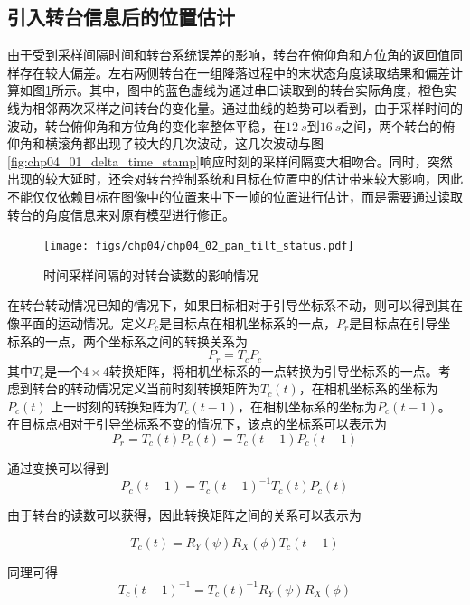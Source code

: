 \subsection{引入转台信息后的位置估计}
由于受到采样间隔时间和转台系统误差的影响，转台在俯仰角和方位角的返回值同样存在较大偏差。左右两侧转台在一组降落过程中的末状态角度读取结果和偏差计算如图\ref{fig:chp04_02_pan_tilt_status}所示。其中，图中的蓝色虚线为通过串口读取到的转台实际角度，橙色实线为相邻两次采样之间转台的变化量。通过曲线的趋势可以看到，由于采样时间的波动，转台俯仰角和方位角的变化率整体平稳，在$12\ s$到$16\ s$之间，两个转台的俯仰角和横滚角都出现了较大的几次波动，这几次波动与图\ref{fig:chp04_01_delta_time_stamp}响应时刻的采样间隔变大相吻合。同时，突然出现的较大延时，还会对转台控制系统和目标在位置中的估计带来较大影响，因此不能仅仅依赖目标在图像中的位置来中下一帧的位置进行估计，而是需要通过读取转台的角度信息来对原有模型进行修正。
\begin{figure}[ht]   
	\centering
	\texttt{[image: figs/chp04/chp04\_02\_pan\_tilt\_status.pdf]}
	\caption{时间采样间隔的对转台读数的影响情况}
	\label{fig:chp04_02_pan_tilt_status}
\end{figure}

在转台转动情况已知的情况下，如果目标相对于引导坐标系不动，则可以得到其在像平面的运动情况。定义$P_c$是目标点在相机坐标系的一点，$P_r$是目标点在引导坐标系的一点，两个坐标系之间的转换关系为
\begin{equation}
P_r = T_c P_c
\end{equation}
其中$T_c$是一个$4 \times 4$转换矩阵，将相机坐标系的一点转换为引导坐标系的一点。考虑到转台的转动情况定义当前时刻转换矩阵为$T_c(t)$，在相机坐标系的坐标为$P_c(t)$ 上一时刻的转换矩阵为$T_c(t-1)$，在相机坐标系的坐标为$P_c(t-1)$。在目标点相对于引导坐标系不变的情况下，该点的坐标系可以表示为
\begin{equation}
P_r = T_c(t) P_c(t) =T_c(t-1) P_c(t-1)
\end{equation}

通过变换可以得到
\begin{equation}
\label{eq:chp04_predict_position}
P_c(t-1) = T_c(t-1)^{-1}T_c(t) P_c(t)
\end{equation}

由于转台的读数可以获得，因此转换矩阵之间的关系可以表示为

\begin{equation}
T_c(t) = R_Y(\psi)R_X(\phi)T_c(t-1)
\end{equation}

同理可得
\begin{equation}
T_c(t-1)^{-1} = T_c(t)^{-1}R_Y(\psi)R_X(\phi)
\end{equation}

